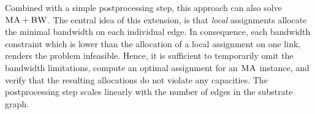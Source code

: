 \documentclass[9pt]{sigcomm-alternate}
\newcommand{\stefan}[1]{\textcolor{blue}{stefan: #1}}
\newcommand{\VmChunkAssignment}{\mu}
\newcommand{\VirtualNode}{v}
\newcommand{\achunk}{\ensuremath{c}}
\newcommand{\CC}{\textsc{NI}}
\newcommand{\BW}{\textsc{BW}}
\newcommand{\MA}{\textsc{MA}}
\begin{document}

Combined with a simple postprocessing step, this approach can also solve $\MA+\BW$. The central idea of this extension, is
that \emph{local} assignments allocate the minimal bandwidth 
on each individual edge. In consequence, each bandwidth constraint
which is lower than the allocation of a local assignment on one link, renders
the problem infeasible. Hence, it is sufficient to temporarily omit the
bandwidth limitations, compute an optimal assignment for an $\MA$ instance, and
verify that the resulting allocations do not violate any capacities. The
postprocessing step scales linearly with the number of edges in the substrate
graph. 
\end{document}
